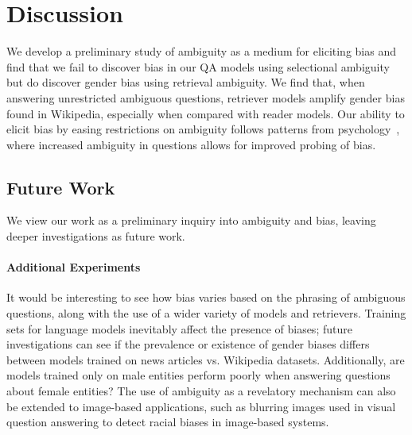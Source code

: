 \section{Discussion}
We develop a preliminary study of ambiguity as a medium for eliciting bias and find that we fail to discover bias in our QA models using selectional ambiguity but do discover gender bias using retrieval ambiguity. 
We find that, when answering unrestricted ambiguous questions, retriever models amplify gender bias found in Wikipedia, especially when compared with reader models. 
Our ability to elicit bias by easing restrictions on ambiguity follows patterns from psychology~\cite{felson1981ambiguity}, where increased ambiguity in questions allows for improved probing of bias. 
\subsection{Future Work}
We view our work as a preliminary inquiry into ambiguity and bias, leaving deeper investigations as future work.

\paragraph{Additional Experiments}
It would be interesting to see how bias varies based on the phrasing of ambiguous questions, along with the use of a wider variety of models and retrievers. 
Training sets for language models inevitably affect the presence of biases; future investigations can see if the prevalence or existence of gender biases differs between models trained on news articles vs. Wikipedia datasets. 
Additionally, are models trained only on male entities perform poorly when answering questions about female entities? 
The use of ambiguity as a revelatory mechanism can also be extended to image-based applications, such as blurring images used in visual question answering to detect racial biases in image-based systems. 


